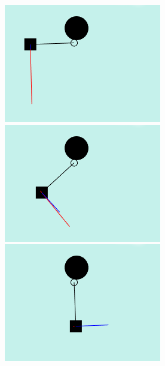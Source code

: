\documentclass[]{report}
\begin{document}
			\begin{figure}[H]
				\centering
				\begin{subfigure}[b]{1\textwidth}
		        \includegraphics[scale=0.4]{swingingMotionLeftTop}
		        \includegraphics[scale=0.4]{swingingMotionLeftLower}
		        \includegraphics[scale=0.4]{swingingMotionBottom}
		        \end{subfigure}
		        
		        \vspace{3 pt}
		        

\end{figure}
\end{document}
